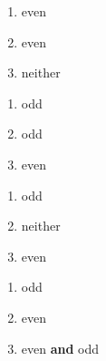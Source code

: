 \documentclass{ximera}
\begin{document}
\begin{enumerate}
\setcounter{enumi}{\value{HW}}

\item even
\item even
\item neither

\setcounter{HW}{\value{enumi}}
\end{enumerate}


\begin{enumerate}
\setcounter{enumi}{\value{HW}}

\item odd
\item odd
\item even

\setcounter{HW}{\value{enumi}}
\end{enumerate}

\begin{enumerate}
\setcounter{enumi}{\value{HW}}

\item odd
\item neither
\item even

\setcounter{HW}{\value{enumi}}
\end{enumerate}

\begin{enumerate}
\setcounter{enumi}{\value{HW}}

\item odd
\item even
\item even  \textbf{and} odd

\setcounter{HW}{\value{enumi}}
\end{enumerate}
\end{document}

